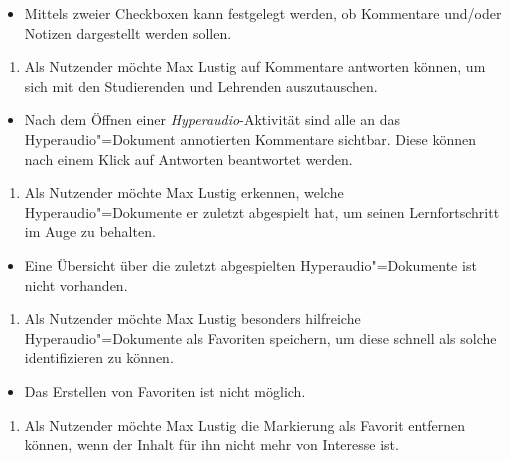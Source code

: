 \vspace{-0.1cm}
\begin{itemize}
\item[\Checkmark]
Mittels zweier Checkboxen kann festgelegt werden, ob Kommentare und/oder Notizen dargestellt werden sollen.
\end{itemize}
\vspace{0.25cm}
\begin{enumerate}[resume*]
\item \label{US-Antwort-S-Eval} Als Nutzender möchte Max Lustig auf Kommentare antworten können, um sich mit den Studierenden und Lehrenden auszutauschen.
\end{enumerate}
\vspace{-0.1cm}
\begin{itemize}
\item[\Checkmark]
Nach dem Öffnen einer \textit{Hyperaudio}-Aktivität sind alle an das Hyperaudio"=Dokument annotierten Kommentare sichtbar. Diese können nach einem Klick auf \glqq Antworten\grqq{} beantwortet werden.
\end{itemize}
\vspace{0.25cm}
\begin{enumerate}[resume*]
\item \label{US-Uebersicht-Letzte-Eval} Als Nutzender möchte Max Lustig erkennen, welche Hyperaudio"=Dokumente er zuletzt abgespielt hat, um seinen Lernfortschritt im Auge zu behalten.
\end{enumerate}
\vspace{-0.1cm}
\begin{itemize}
\item[\XSolidBrush]
Eine Übersicht über die zuletzt abgespielten Hyperaudio"=Dokumente ist nicht vorhanden.
\end{itemize}
\vspace{0.25cm}
\begin{enumerate}[resume*]
\item \label{US-Favoriten-Eval} Als Nutzender möchte Max Lustig besonders hilfreiche Hyperaudio"=Dokumente als Favoriten speichern, um diese schnell als solche identifizieren zu können.
\end{enumerate}
\vspace{-0.1cm}
\begin{itemize}
\item[\XSolidBrush]
Das Erstellen von Favoriten ist nicht möglich.
\end{itemize}
\vspace{0.25cm}
\begin{enumerate}[resume*]
\item \label{US-Favoriten-Loeschen-Eval} Als Nutzender möchte Max Lustig die Markierung als Favorit entfernen können, wenn der Inhalt für ihn nicht mehr von Interesse ist.
\end{enumerate}

